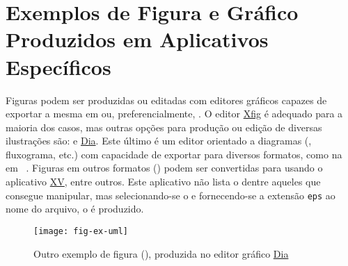 
\graphicspath{%
  {./Post-Textual/}%
  {./Post-Textual/Illustrations/}%
}

\chapter{Exemplos de Figura e Gráfico Produzidos em Aplicativos Específicos}%
\label{chpt:anx-b}

Figuras podem ser produzidas ou editadas com editores gráficos capazes de exportar a mesma em  ou, preferencialmente, .
O editor \href{https://www.xfig.org/}{Xfig\LinkIcon} é adequado para a maioria dos casos, mas outras opções para produção ou edição de diversas ilustrações são: \href{https://www.gimp.org/}{\LinkIcon} e \href{http://dia-installer.de/}{Dia\LinkIcon}.
Este último é um editor orientado a diagramas (, fluxograma, etc.) com capacidade de exportar para diversos formatos, como na  em ~\cite{Larsson2020}.
Figuras em outros formatos () podem ser convertidas para  usando o aplicativo \href{https://github.com/jasper-software/xv.git}{XV\LinkIcon}, entre outros.
Este aplicativo não lista o  dentre aqueles que consegue manipular, mas selecionando-se o  e fornecendo-se a extensão \texttt{eps} ao nome do arquivo, o  é produzido.

\begin{figure}[!htbp]
\SetCaptionWidth{\textwidth}
\caption[%
  Outro exemplo de figura (UML), produzida no editor gráfico Dia%
]{%
  Outro exemplo de figura (), produzida no editor gráfico \href{http://dia-installer.de/}{Dia\LinkIcon}%
}%
\label{fig:ex-uml}
\texttt{[image: fig-ex-uml]}
\end{figure}

